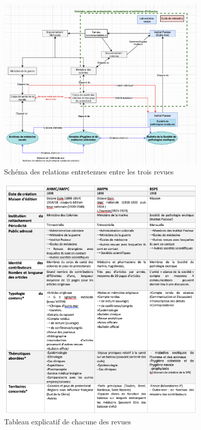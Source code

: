 \begin{figure}
    \centering
    \includegraphics[width=10cm]{./images/schema-AHMC-AMN-BSPE}
    \caption{Schéma des relations entretenues entre les trois revues}
    \label{Schema-BDD-memoire}
\end{figure}




\begin{figure}
    \centering
    \includegraphics[width=10cm]{./images/Tableau comparaison}
    \caption{Tableau explicatif de chacune des revues}
    \label{Schema-BDD-memoire}
\end{figure}
